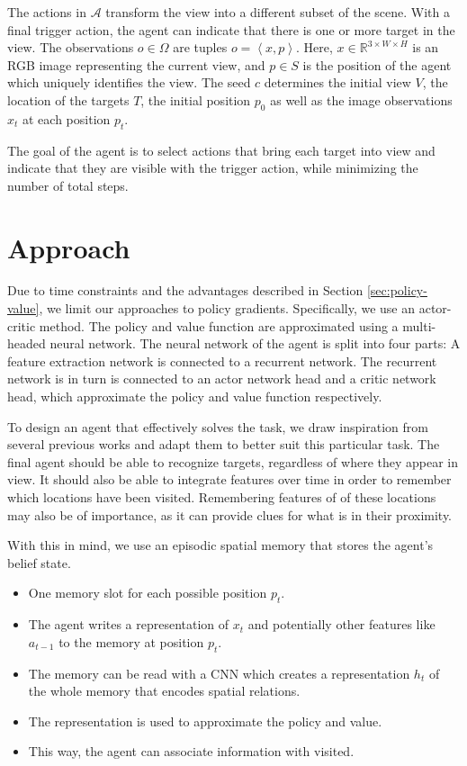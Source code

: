 The actions in \(\mathcal{A}\) transform the view into a different subset of the scene.
With a final trigger action, the agent can indicate that there is one or more target in the view.
The observations \(o \in \Omega\) are tuples \(o = \left\langle x, p \right\rangle\).
Here, \(x \in \mathbb{R}^{3 \times W \times H}\) is an RGB image representing the current view, and \(p \in S\) is the position of the agent which uniquely identifies the view.
The seed \(c\) determines the initial view \(V\), the location of the targets \(T\), the initial position \(p_0\) as well as the image observations \(x_t\) at each position \(p_t\).

The goal of the agent is to select actions that bring each target into view and indicate that they are visible with the trigger action, while minimizing the number of total steps.



\section{Approach}
\label{sec:approach}

Due to time constraints and the advantages described in Section \ref{sec:policy-value}, we limit our approaches to policy gradients.
Specifically, we use an actor-critic method.
The policy and value function are approximated using a multi-headed neural network.
The neural network of the agent is split into four parts:
A feature extraction network is connected to a recurrent network.
The recurrent network is in turn is connected to an actor network head and a critic network head, which approximate the policy and value function respectively.

To design an agent that effectively solves the task, we draw inspiration from several previous works and adapt them to better suit this particular task.
The final agent should be able to recognize targets, regardless of where they appear in view.
It should also be able to integrate features over time in order to remember which locations have been visited.
Remembering features of of these locations may also be of importance, as it can provide clues for what is in their proximity. 

With this in mind, we use an episodic spatial memory that stores the agent's belief state.

\begin{itemize}
    \item One memory slot for each possible position \(p_t\).
    \item The agent writes a representation of \(x_t\) and potentially other features like \(a_{t-1}\) to the memory at position \(p_t\).
    \item The memory can be read with a CNN which creates a representation \(h_t\) of the whole memory that encodes spatial relations.
    \item The representation is used to approximate the policy and value.
    \item This way, the agent can associate information with visited.
\end{itemize}

